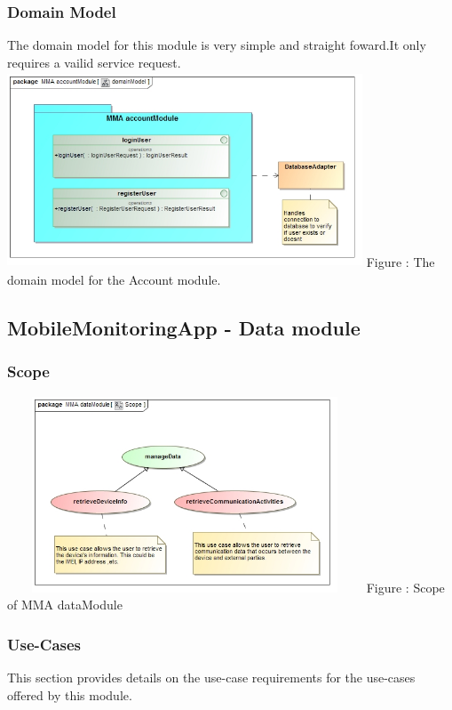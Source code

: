 \documentclass[hidelinks, 12pt, oneside]{article}
\begin{document}
		\subsubsection{Domain Model}
		
		The domain model for this module is very simple and straight foward.It only requires a vailid service request.\newline
		\includegraphics[width=400px,height=220px]{img/DomainModelAccountModule.jpg}
		Figure : The domain model for the Account module.
	
	\subsection{MobileMonitoringApp - Data module}
	\subsubsection{Scope}
		\includegraphics[width=400px,height=220px]{img/scopeData.jpg}
		Figure : Scope of MMA dataModule	
		
		
	
	\subsubsection{Use-Cases}
		This section provides details on the use-case requirements for the use-cases offered by this module.	
		
\end{document}
